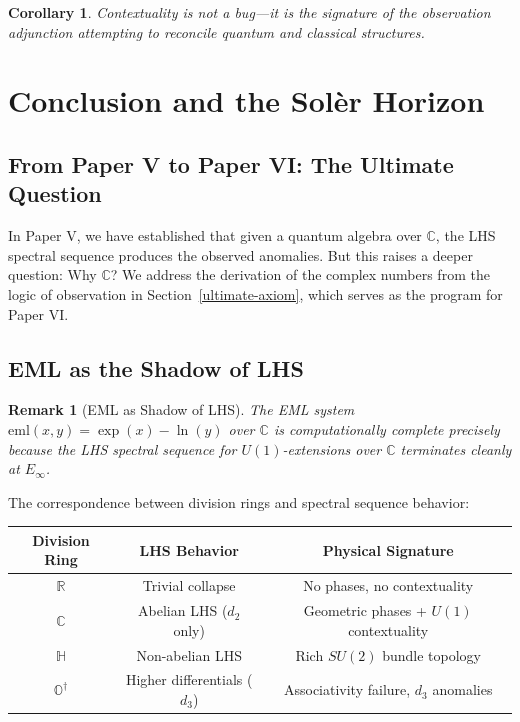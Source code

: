 \documentclass[11pt]{article}
\newtheorem{remark}[theorem]{Remark}
\newtheorem{corollary}[theorem]{Corollary}
\begin{document}
\begin{corollary}\label{cor:contextuality}
Contextuality is not a bug---it is the signature of the observation adjunction attempting to reconcile quantum and classical structures.
\end{corollary}

\section{Conclusion and the Sol\`{e}r Horizon}
\label{conclusion}

\subsection{From Paper V to Paper VI: The Ultimate Question}
\label{ultimate-question}

In Paper V, we have established that given a quantum algebra over $\mathbb{C}$, the LHS spectral sequence produces the observed anomalies. But this raises a deeper question: Why $\mathbb{C}$? We address the derivation of the complex numbers from the logic of observation in Section~\ref{ultimate-axiom}, which serves as the program for Paper VI.

\subsection{EML as the Shadow of LHS}
\label{eml-shadow}

\begin{remark}[EML as Shadow of LHS]\label{rem:eml}
The EML system $\text{eml}(x, y) = \exp(x) - \ln(y)$ over $\mathbb{C}$ is computationally complete precisely because the LHS spectral sequence for $U(1)$-extensions over $\mathbb{C}$ terminates cleanly at $E_\infty$.
\end{remark}

The correspondence between division rings and spectral sequence behavior:

\begin{center}
\begin{tabular}{c|c|c}
\toprule
\textbf{Division Ring} & \textbf{LHS Behavior} & \textbf{Physical Signature} \\
\midrule
$\mathbb{R}$ & Trivial collapse & No phases, no contextuality \\
$\mathbb{C}$ & Abelian LHS ($d_2$ only) & Geometric phases + $U(1)$ contextuality \\
$\mathbb{H}$ & Non-abelian LHS & Rich $SU(2)$ bundle topology \\
$\mathbb{O}^\dagger$ & Higher differentials ($d_3$) & Associativity failure, $d_3$ anomalies \\
\bottomrule
\end{tabular}
\end{center}
\end{document}
